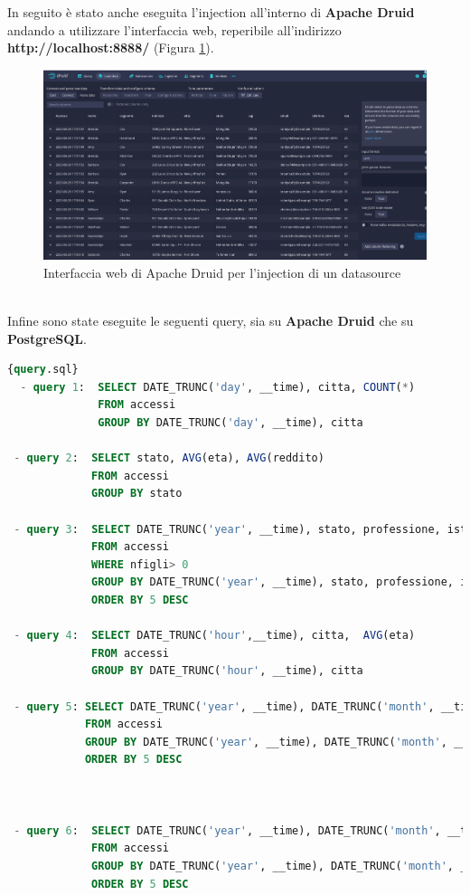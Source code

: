 In seguito è stato anche eseguita l'\gls{injection}{} all'interno di \textbf{Apache Druid} 
andando a utilizzare l'interfaccia web, reperibile all'indirizzo
\textbf{http://localhost:8888/} (Figura \ref{fig:injection}).
\begin{figure}[h]
  \centering
  \includegraphics[width=1\textwidth]{images/percorso/load_data.png}
  \caption{Interfaccia web di Apache Druid per l'injection di un datasource}
  \label{fig:injection}
\end{figure}
\pagebreak
\\
Infine sono state eseguite le seguenti query, sia su \textbf{Apache Druid} che su \textbf{PostgreSQL}.
\begin{lstlisting}[language=SQL, caption=\texttt{query.sql}, label=lst:file]{query.sql}
  - query 1:  SELECT DATE_TRUNC('day', __time), citta, COUNT(*)
              FROM accessi
              GROUP BY DATE_TRUNC('day', __time), citta
       
 - query 2:  SELECT stato, AVG(eta), AVG(reddito)
             FROM accessi
             GROUP BY stato
       
 - query 3:  SELECT DATE_TRUNC('year', __time), stato, professione, istruzione, nfigli, COUNT(*)
             FROM accessi
             WHERE nfigli> 0
             GROUP BY DATE_TRUNC('year', __time), stato, professione, istruzione, nfigli
             ORDER BY 5 DESC
       
 - query 4:  SELECT DATE_TRUNC('hour',__time), citta,  AVG(eta)
             FROM accessi
             GROUP BY DATE_TRUNC('hour', __time), citta  
 
 - query 5: SELECT DATE_TRUNC('year', __time), DATE_TRUNC('month', __time), DATE_TRUNC('day', __time),    stato, professione, istruzione, nfigli, COUNT(*) 
            FROM accessi
            GROUP BY DATE_TRUNC('year', __time), DATE_TRUNC('month', __time), DATE_TRUNC('day', __time), stato, professione, istruzione, nfigli
            ORDER BY 5 DESC



 - query 6:  SELECT DATE_TRUNC('year', __time), DATE_TRUNC('month', __time), DATE_TRUNC('day', __time), DATE_TRUNC('hour', __time), stato, professione, istruzione, nfigli, COUNT(*) 
             FROM accessi
             GROUP BY DATE_TRUNC('year', __time), DATE_TRUNC('month', __time), DATE_TRUNC('day', __time), DATE_TRUNC('hour', __time), stato, professione, istruzione, nfigli
             ORDER BY 5 DESC           
 \end{lstlisting}

